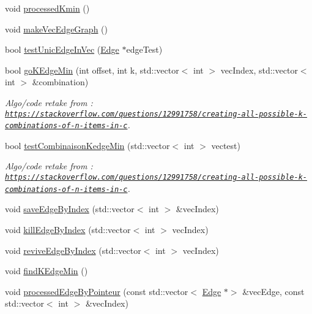 \begin{DoxyCompactItemize}
void \mbox{\hyperlink{struct_algorithm_a659a436333cd45d8a3c9b5a6b83ca262}{processed\+Kmin}} ()
\item 
void \mbox{\hyperlink{struct_algorithm_a0baa64983c2bc5762470691ec5911910}{make\+Vec\+Edge\+Graph}} ()
\item 
bool \mbox{\hyperlink{struct_algorithm_a2f0d23d667515747f55fc21c359c2fb1}{test\+Unic\+Edge\+In\+Vec}} (\mbox{\hyperlink{class_edge}{Edge}} $\ast$edge\+Test)
\item 
bool \mbox{\hyperlink{struct_algorithm_a4f5902055c640f4ec1a037e7c24cb772}{go\+K\+Edge\+Min}} (int offset, int k, std\+::vector$<$ int $>$ vec\+Index, std\+::vector$<$ int $>$ \&combination)
\begin{DoxyCompactList}\small\item\em Algo/code retake from \+: \href{https://stackoverflow.com/questions/12991758/creating-all-possible-k-combinations-of-n-items-in-c}{\tt https\+://stackoverflow.\+com/questions/12991758/creating-\/all-\/possible-\/k-\/combinations-\/of-\/n-\/items-\/in-\/c}. \end{DoxyCompactList}\item 
bool \mbox{\hyperlink{struct_algorithm_a7ada217d91dc5b83c84c851ec4441433}{test\+Combinaison\+Kedge\+Min}} (std\+::vector$<$ int $>$ vectest)
\begin{DoxyCompactList}\small\item\em Algo/code retake from \+: \href{https://stackoverflow.com/questions/12991758/creating-all-possible-k-combinations-of-n-items-in-c}{\tt https\+://stackoverflow.\+com/questions/12991758/creating-\/all-\/possible-\/k-\/combinations-\/of-\/n-\/items-\/in-\/c}. \end{DoxyCompactList}\item 
void \mbox{\hyperlink{struct_algorithm_a946680d5d61db2c1f71ee80f95e6436e}{save\+Edge\+By\+Index}} (std\+::vector$<$ int $>$ \&vec\+Index)
\item 
void \mbox{\hyperlink{struct_algorithm_a4527b9ab55d27dcaf015181bb3e1b99a}{kill\+Edge\+By\+Index}} (std\+::vector$<$ int $>$ vec\+Index)
\item 
void \mbox{\hyperlink{struct_algorithm_a698172d74eea712bc92a75375a1de946}{revive\+Edge\+By\+Index}} (std\+::vector$<$ int $>$ vec\+Index)
\item 
void \mbox{\hyperlink{struct_algorithm_ae0961d8c30105f3ea9db598f2548bdb9}{find\+K\+Edge\+Min}} ()
\item 
void \mbox{\hyperlink{struct_algorithm_ad92c4d7081bf7851114a5f9b76b106bf}{processed\+Edge\+By\+Pointeur}} (const std\+::vector$<$ \mbox{\hyperlink{class_edge}{Edge}} $\ast$$>$ \&vec\+Edge, const std\+::vector$<$ int $>$ \&vec\+Index)
$$
\end{DoxyCompactItemize}
